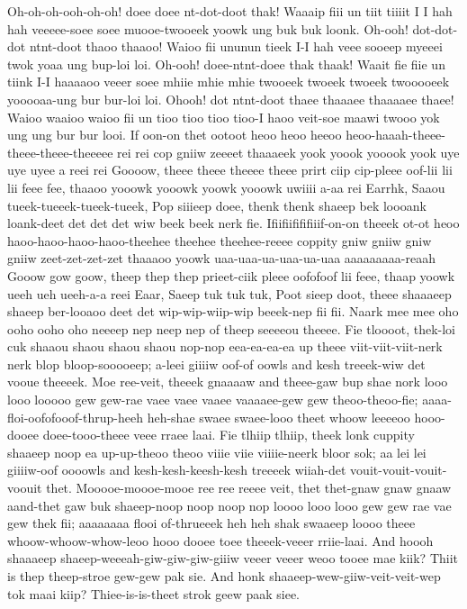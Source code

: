 \documentclass[12pt,a4paper]{article}
\begin{document}
\begin{drama}
\euelspeaks
Oh-oh-oh-ooh-oh-oh! doee doee nt-dot-doot thak! Waaaip fiii un tiit tiiiit I I hah hah veeeee-soee soee muooe-twooeek yoowk ung buk buk loonk. Oh-ooh! dot-dot-dot ntnt-doot thaoo thaaoo! Waioo fii ununun tieek I-I hah veee sooeep myeeei twok yoaa ung bup-loi loi. Oh-ooh! doee-ntnt-doee thak thaak! Waait fie fiie un tiink I-I haaaaoo veeer soee mhiie mhie mhie twooeek twoeek twoeek twooooeek yooooaa-ung bur bur-loi loi. Ohooh! dot ntnt-doot thaee thaaaee thaaaaee thaee! Waioo waaioo waioo fii un tioo tioo tioo tioo-I haoo veit-soe maawi twooo yok ung ung bur bur looi.
\pistspeaks
If oon-on thet ootoot heoo heoo heeoo heoo-haaah-theee-theee-theee-theeeee rei rei cop gniiw zeeeet thaaaeek yook yoook yooook yook uye uye uyee a reei rei Goooow, theee theee theeee theee prirt ciip cip-pleee oof-lii lii lii feee fee, thaaoo yooowk yooowk yoowk yooowk uwiiii a-aa rei Earrhk, Saaou tueek-tueeek-tueek-tueek, Pop siiieep doee, thenk thenk shaeep bek loooank loank-deet det det det wiw beek beek nerk fie. Ifiifiifififiiif-on-on theeek ot-ot heoo haoo-haoo-haoo-haoo-theehee theehee theehee-reeee coppity gniw gniiw gniw gniiw zeet-zet-zet-zet thaaaoo yoowk uaa-uaa-ua-uaa-ua-uaa aaaaaaaaa-reaah Gooow gow goow, theep thep thep prieet-ciik pleee oofofoof lii feee, thaap yoowk ueeh ueh ueeh-a-a reei Eaar, Saeep tuk tuk tuk, Poot sieep doot, theee shaaaeep shaeep ber-looaoo deet det wip-wip-wiip-wip beeek-nep fii fii.
\epopspeaks
Naark mee mee oho ooho ooho oho neeeep nep neep nep of theep seeeeou theeee.
\pistspeaks
Fie tloooot, thek-loi cuk shaaou shaou shaou shaou nop-nop eea-ea-ea-ea up theee viit-viit-viit-nerk nerk blop bloop-sooooeep; a-leei giiiiw oof-of oowls and kesh treeek-wiw det vooue theeeek. Moe ree-veit, theeek gnaaaaw and theee-gaw bup shae nork looo looo looooo gew gew-rae vaee vaee vaaee vaaaaee-gew gew theoo-theoo-fie; aaaa-floi-oofofooof-thrup-heeh heh-shae swaee swaee-looo theet whoow leeeeoo hooo-dooee doee-tooo-theee veee rraee laai. Fie tlhiip tlhiip, theek lonk cuppity shaaeep noop ea up-up-theoo theoo viiie viie viiiie-neerk bloor sok; aa lei lei giiiiw-oof oooowls and kesh-kesh-keesh-kesh treeeek wiiah-det vouit-vouit-vouit-voouit thet. Mooooe-moooe-mooe ree ree reeee veit, thet thet-gnaw gnaw gnaaw aand-thet gaw buk shaeep-noop noop noop nop loooo looo looo gew gew rae vae gew thek fii; aaaaaaaa flooi of-thrueeek heh heh shak swaaeep loooo theee whoow-whoow-whow-leoo hooo dooee toee theeek-veeer rriie-laai.
\epopspeaks
And hoooh shaaaeep shaeep-weeeah-giw-giw-giw-giiiw veeer veeer weoo tooee mae kiik? Thiit is thep theep-stroe gew-gew pak sie. And honk shaaeep-wew-giiw-veit-veit-wep tok maai kiip? Thiee-is-is-theet strok geew paak siee.

\end{drama}
\end{document}
